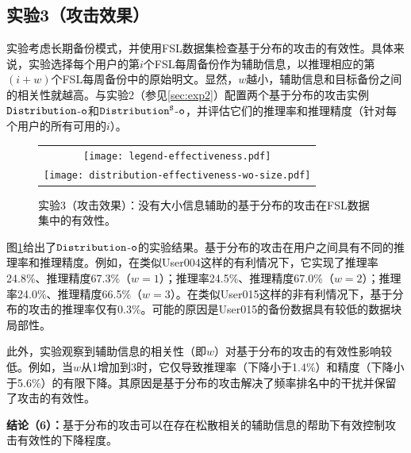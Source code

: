 \subsection{实验3（攻击效果）} 
\label{sec:exp3}
实验考虑长期备份模式，并使用FSL数据集检查基于分布的攻击的有效性。具体来说，实验选择每个用户的第$i$个FSL每周备份作为辅助信息，以推理相应的第$(i+w)$个FSL每周备份中的原始明文。显然，$w$越小，辅助信息和目标备份之间的相关性就越高。与实验2（参见\ref{sec:exp2}）配置两个基于分布的攻击实例$\tt Distribution$-$\tt o$和$\tt Distribution^S$-$\tt o$，并评估它们的推理率和推理精度（针对每个用户的所有可用的$i$）。

\begin{figure}[!htbp]
    \centering
    \centering
    \begin{tabular}{c}
        \texttt{[image: legend-effectiveness.pdf]}\\
        \texttt{[image: distribution-effectiveness-wo-size.pdf]}
    \end{tabular}
	\caption{实验3（攻击效果）：没有大小信息辅助的基于分布的攻击在FSL数据集中的有效性。}
	\label{fig:experiment-distribution-effectiveness-wo}
\end{figure}

图\ref{fig:experiment-distribution-effectiveness-wo}给出了$\tt Distribution$-$\tt o$的实验结果。基于分布的攻击在用户之间具有不同的推理率和推理精度。例如，在类似User004这样的有利情况下，它实现了推理率24.8\%、推理精度67.3\%（$w = 1$）；推理率24.5\%、推理精度67.0\%（$w = 2$）；推理率24.0\%、推理精度66.5\%（$w = 3$）。在类似User015这样的非有利情况下，基于分布的攻击的推理率仅有0.3\%。可能的原因是User015的备份数据具有较低的数据块局部性。

此外，实验观察到辅助信息的相关性（即$w$）对基于分布的攻击的有效性影响较低。例如，当$w$从1增加到3时，它仅导致推理率（下降小于1.4\%）和精度（下降小于5.6\%）的有限下降。其原因是基于分布的攻击解决了频率排名中的干扰并保留了攻击的有效性。

\textbf{结论（6）：}基于分布的攻击可以在存在松散相关的辅助信息的帮助下有效控制攻击有效性的下降程度。


